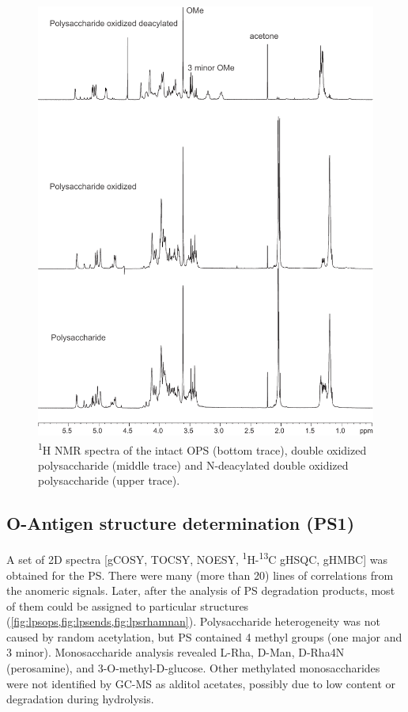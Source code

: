 		\begin{figure}[ph]
			\begin{center}
				\includegraphics[height=0.9\textheight]{lps_chapter/img/lpsfig1.pdf}
			\end{center}
			\caption{\textsuperscript{1}H \ac{NMR} spectra of the intact \caulobacter{} \ac{OPS}  (bottom trace), double oxidized polysaccharide (middle trace) and N-deacylated double oxidized polysaccharide (upper trace).}
			\label{fig:lpsfig1}
		\end{figure}

	\subsection{O-Antigen structure determination (PS1)} %
	\label{sub:o_antigen_structure_determination_ps1_}

		A set of 2D spectra [\ac{gCOSY}, \ac{TOCSY}, \ac{NOESY}, \textsuperscript{1}H-\textsuperscript{13}C \ac{gHSQC}, \ac{gHMBC}] was obtained for the \ac{PS}. There were many (more than 20) lines of correlations from the anomeric signals. Later, after the analysis of \ac{PS} degradation products, most of them could be assigned to particular structures (\cref{fig:lpsops,fig:lpsends,fig:lpsrhamnan}). Polysaccharide heterogeneity was not caused by random acetylation, but \ac{PS} contained 4 methyl groups (one major and 3 minor). Monosaccharide analysis revealed L-Rha, D-Man, D-Rha4N (perosamine), and 3-O-methyl-D-glucose. Other methylated monosaccharides were not identified by GC-MS as alditol acetates, possibly due to low content or degradation during hydrolysis.

